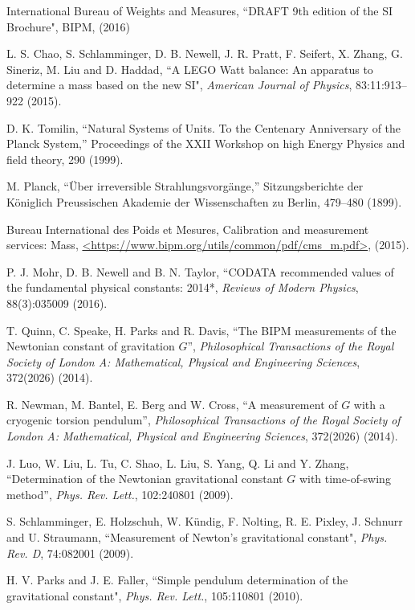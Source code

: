 \documentclass[prb,preprint]{revtex4-1}
\begin{document}
\begin{thebibliography}{99}
 International Bureau of Weights and Measures, ``DRAFT 9th edition of the SI Brochure", BIPM, (2016)

 L. S. Chao, S. Schlamminger, D. B. Newell, J. R. Pratt, F. Seifert, X. Zhang, G. Sineriz, M. Liu and D. Haddad, ``A LEGO Watt balance: An apparatus to determine a mass based on the new SI", \textit{American Journal of Physics}, 83:11:913--922 (2015).

 D. K. Tomilin, ``Natural Systems of Units. To the Centenary Anniversary of the Planck System,'' 
Proceedings of the XXII Workshop on high Energy Physics and field theory, 290 (1999).  

 M. Planck, ``\"{U}ber irreversible {S}trahlungsvorg\"{a}nge,'' 
Sitzungsberichte der K\"{o}niglich Preussischen Akademie der Wissenschaften zu Berlin, 479--480 (1899).  

 Bureau International des Poids et Mesures, Calibration and measurement services: Mass, \url{<https://www.bipm.org/utils/common/pdf/cms_m.pdf>}, (2015).

 P. J. Mohr, D. B. Newell and B. N. Taylor, ``CODATA recommended values of the fundamental physical constants: 2014*, \textit{Reviews of Modern Physics}, 88(3):035009 (2016).

 T. Quinn, C. Speake, H. Parks and R. Davis, ``The BIPM measurements of the Newtonian constant of gravitation $G$'', \textit{Philosophical Transactions of the Royal Society of London A: Mathematical, Physical and Engineering Sciences}, 372(2026) (2014).

 R. Newman, M. Bantel, E. Berg and W. Cross, ``A measurement of $G$ with a cryogenic torsion pendulum'', \textit{Philosophical Transactions of the Royal Society of London A: Mathematical, Physical and Engineering Sciences}, 372(2026) (2014).

 J. Luo, W. Liu, L. Tu, C. Shao, L. Liu, S. Yang, Q. Li and Y. Zhang, ``Determination of the Newtonian gravitational constant $G$ with time-of-swing method'', \textit{Phys. Rev. Lett.}, 102:240801 (2009).

 S. Schlamminger, E. Holzschuh, W. Kündig, F. Nolting, R. E. Pixley, J. Schnurr and U. Straumann, ``Measurement of Newton's gravitational constant", \textit{Phys. Rev. D}, 74:082001 (2009).

 H. V. Parks and J. E. Faller, ``Simple pendulum determination of the gravitational constant", \textit{Phys. Rev. Lett.}, 105:110801 (2010).


\end{thebibliography}
\end{document}
